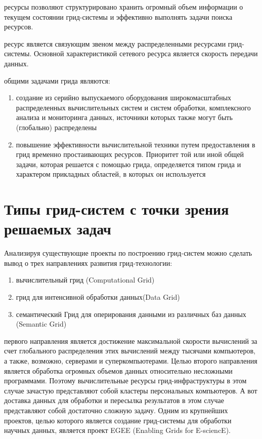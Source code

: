 \documentclass[och, referat]{SCWorks}
\begin{document}
 ресурсы позволяют структурировано хранить огромный объем информации о текущем состоянии грид-системы и эффективно выполнять задачи поиска ресурсов.
\newline

 ресурс является связующим звеном между распределенными ресурсами грид-системы. Основной характеристикой сетевого ресурса является скорость передачи данных. 
 \newline

 общими задачами грида являются: 
\begin{enumerate} 
\item   создание из серийно выпускаемого оборудования широкомасштабных распределенных вычислительных систем и систем обработки, комплексного анализа и мониторинга данных, источники которых также могут быть (глобально) распределены
\item 
повышение эффективности вычислительной техники путем предоставления в грид временно простаивающих ресурсов. Приоритет той или иной общей задачи, которая решается с помощью грида, определяется типом грида и характером прикладных областей, в которых он используется
\end{enumerate}


\section{Типы грид-систем с точки зрения решаемых задач}

Анализируя существующие проекты по построению грид-систем можно сделать вывод о трех направлениях развития грид-технологии: 
\begin{enumerate} 

\item вычислительный грид (Computational Grid)
\item грид для интенсивной обработки данных(Data Grid)
\item семантический Грид для оперирования данными из различных баз данных (Semantic Grid)
\end{enumerate}

 первого направления является достижение максимальной скорости вычислений за счет глобального распределения этих вычислений между тысячами компьютеров, а также, возможно, серверами и суперкомпьютерами. Целью второго направления является обработка огромных объемов данных относительно несложными программами. Поэтому вычислительные ресурсы грид-инфраструктуры в этом случае зачастую представляют собой кластеры персональных компьютеров. А вот доставка данных для обработки и пересылка результатов в этом случае представляют собой достаточно сложную задачу. Одним из крупнейших проектов, целью которого является создание грид-системы для обработки научных данных, является проект EGEE (Enabling Grids for E-sciencE)\cite{bib:egee}.
\newline
\end{document}
